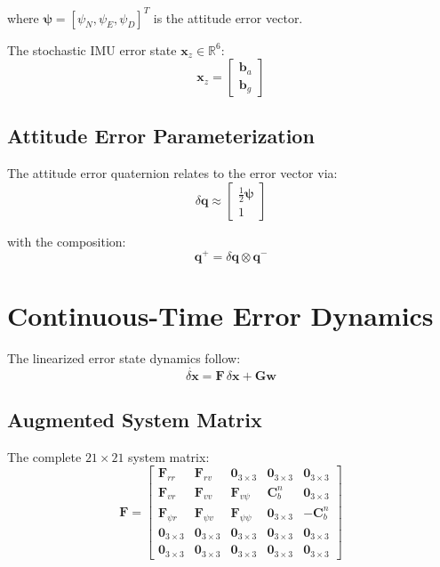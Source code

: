 \documentclass[11pt,a4paper]{article}
\newcommand{\mat}[1]{\mathbf{#1}}
\newcommand{\vect}[1]{\boldsymbol{#1}}
\newcommand{\quat}[1]{\mathbf{#1}}
\newcommand{\Rn}{\mathbb{R}}
\begin{document}
where $\vect{\psi} = [\psi_N, \psi_E, \psi_D]^T$ is the attitude error vector.

The stochastic IMU error state $\mat{x}_z \in \Rn^{6}$:
\begin{equation}
    \mat{x}_z = \begin{bmatrix}
        \mat{b}_a \\ \mat{b}_g
    \end{bmatrix}
\end{equation}

\subsection{Attitude Error Parameterization}

The attitude error quaternion relates to the error vector via:
\begin{equation}
    \delta\quat{q} \approx \begin{bmatrix}
        \frac{1}{2}\vect{\psi} \\ 1
    \end{bmatrix}
\end{equation}

with the composition:
\begin{equation}
    \quat{q}^+ = \delta\quat{q} \otimes \quat{q}^-
\end{equation}

\section{Continuous-Time Error Dynamics}

The linearized error state dynamics follow:
\begin{equation}
    \dot{\delta\mat{x}} = \mat{F}\,\delta\mat{x} + \mat{G}\mat{w}
\end{equation}

\subsection{Augmented System Matrix}

The complete $21 \times 21$ system matrix:
\begin{equation}
    \mat{F} = \begin{bmatrix}
        \mat{F}_{rr} & \mat{F}_{rv} & \mat{0}_{3\times3} & \mat{0}_{3\times3} & \mat{0}_{3\times3} \\
        \mat{F}_{vr} & \mat{F}_{vv} & \mat{F}_{v\psi} & \mat{C}_b^n & \mat{0}_{3\times3} \\
        \mat{F}_{\psi r} & \mat{F}_{\psi v} & \mat{F}_{\psi\psi} & \mat{0}_{3\times3} & -\mat{C}_b^n \\
        \mat{0}_{3\times3} & \mat{0}_{3\times3} & \mat{0}_{3\times3} & \mat{0}_{3\times3} & \mat{0}_{3\times3} \\
        \mat{0}_{3\times3} & \mat{0}_{3\times3} & \mat{0}_{3\times3} & \mat{0}_{3\times3} & \mat{0}_{3\times3}
    \end{bmatrix}
\end{equation}
\end{document}
